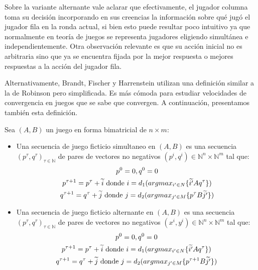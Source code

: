 Sobre la variante alternante vale aclarar que efectivamente, el jugador columna toma su decisión incorporando en sus creencias la información sobre qué jugó el jugador fila en la ronda actual, si bien esto puede resultar poco intuitivo ya que normalmente en teoría de juegos se representa jugadores eligiendo simultánea e independientemente. Otra observación relevante es que su acción inicial no es arbitraria sino que ya se encuentra fijada por la mejor respuesta o mejores respuestas a la acción del jugador fila.

Alternativamente, Brandt, Fischer y Harrenstein utilizan una definición similar a la de Robinson \cite{robinson:zerosum} pero simplificada. Es más cómoda para estudiar velocidades de convergencia en juegos que se sabe que convergen. A continuación, presentamos también esta definición.

\begin{definition} \label{def:fp:brandt}
    Sea $(A, B)$ un juego en forma bimatricial de $n \times m$:
    \begin{itemize}
        \item Una secuencia de juego ficticio simultaneo en $(A, B)$ es una secuencia $(p^\tau, q^\tau)_{\tau \in \mathbb{N}}$ de pares de vectores no negativos $(p^i, q^i) \in \mathbb{N}^n \times \mathbb{N}^m$ tal que:
        \begin{gather*}
            p^0 = \boldmath{0}, q^0 = \boldmath{0} \\
            p^{\tau+1} = p^{\tau} + \widetilde{i} \text{\ donde $i = d_1(argmax_{i' \in N}\{\widetilde{i'}Aq^\tau\})$} \\
            q^{\tau+1} = q^{\tau} + \widetilde{j} \text{\ donde $j = d_2(argmax_{j' \in M}\{p^{\tau}B\widetilde{j'}\})$}
        \end{gather*}
        \item Una secuencia de juego ficticio alternante en $(A, B)$ es una secuencia $(p^\tau, q^\tau)_{\tau \in \mathbb{N}}$  de pares de vectores no negativos $(x^i, y^i) \in \mathbb{N}^n \times \mathbb{N}^m$ tal que:
        \begin{gather*}
            p^0 = \boldmath{0}, q^0 = \boldmath{0} \\
            p^{\tau+1} = p^{\tau} + \widetilde{i} \text{\ donde $i = d_1(argmax_{i' \in N}\{\widetilde{i'}Aq^\tau\})$} \\
            q^{\tau+1} = q^{\tau} + \widetilde{j} \text{\ donde $j = d_2(argmax_{j' \in M}\{p^{\tau+1}B\widetilde{j'}\})$}
        \end{gather*}
    \end{itemize}
\end{definition}

